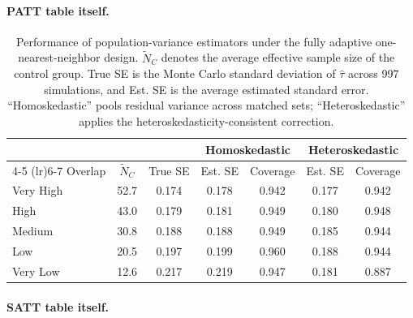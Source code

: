 \documentclass[11pt]{article}
\begin{document}
\paragraph{PATT table itself.}

\begin{table}[hbt!]
\centering
\begin{tabular}{lcccccc}
  \hline
  & & & \multicolumn{2}{c}{Homoskedastic} & \multicolumn{2}{c}{Heteroskedastic} \\
  \cmidrule(lr){4-5} \cmidrule(lr){6-7}
  Overlap & $\tilde{N}_C$ & True SE & Est. SE & Coverage & Est. SE & Coverage \\ 
  \hline
  Very High & 52.7 & 0.174 & 0.178 & 0.942 & 0.177 & 0.942 \\ 
  High      & 43.0 & 0.179 & 0.181 & 0.949 & 0.180 & 0.948 \\ 
  Medium    & 30.8 & 0.188 & 0.188 & 0.949 & 0.185 & 0.944 \\ 
  Low       & 20.5 & 0.197 & 0.199 & 0.960 & 0.188 & 0.944 \\ 
  Very Low  & 12.6 & 0.217 & 0.219 & 0.947 & 0.181 & 0.887 \\ 
   \hline
\end{tabular}
\caption{Performance of population-variance estimators under the fully adaptive one-nearest-neighbor design. $\tilde{N}_C$ denotes the average effective sample size of the control group. True SE is the Monte Carlo standard deviation of $\hat{\tau}$ across 997 simulations, and Est. SE is the average estimated standard error. ``Homoskedastic'' pools residual variance across matched sets; ``Heteroskedastic'' applies the heteroskedasticity-consistent correction.}
\label{tab:toy_var_pooled_vs_het_1nn}
\end{table}

\paragraph{SATT table itself.}
\end{document}
